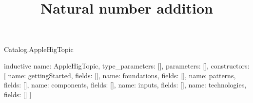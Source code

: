 \begin{lexlean}{Catalog.AppleHigTopic}
\title{Natural number addition}
\begin{semanticmodule}
inductive{
  name: AppleHigTopic,
  type_parameters: [],
  parameters: [],
  constructors: [
    {name: gettingStarted, fields: []},
    {name: foundations, fields: []},
    {name: patterns, fields: []},
    {name: components, fields: []},
    {name: inputs, fields: []},
    {name: technologies, fields: []}
  ]
}
\end{semanticmodule}
\end{lexlean}
